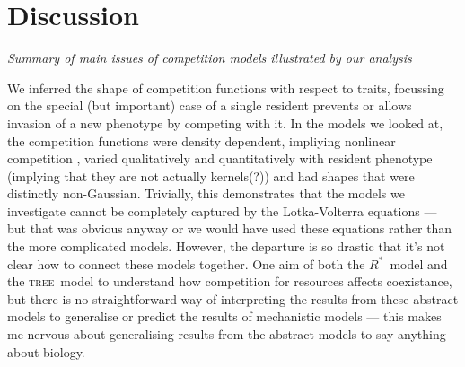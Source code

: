 \documentclass[a4paper,11pt]{article}
\newcommand{\Rstar}{\ensuremath{R^*}}
\newcommand{\TREE}{\textsc{tree}}
\begin{document}
\clearpage
\section{Discussion}

\textit{Summary of main issues of competition models illustrated by
  our analysis}

We inferred the shape of competition functions with respect to traits,
focussing on the special (but important) case of a single resident
prevents or allows invasion of a new phenotype by competing with it.
In the models we looked at, the competition functions were density
dependent, impliying nonlinear competition \citep{Abrams-1980}, varied
qualitatively and quantitatively with resident phenotype (implying
that they are not actually kernels(?)) and had shapes that were
distinctly non-Gaussian.
Trivially, this demonstrates that the models we investigate cannot be
completely captured by the Lotka-Volterra equations --- but that was
obvious anyway or we would have used these equations rather than the
more complicated models.  However, the departure is so drastic that
it's not clear how to connect these models together.  One aim of both
the \Rstar\ model and the \TREE\ model to understand how competition
for resources affects coexistance, but there is no straightforward way
of interpreting the results from these abstract models to generalise
or predict the results of mechanistic models --- this makes me nervous
about generalising results from the abstract models to say anything
about biology.
\end{document}
